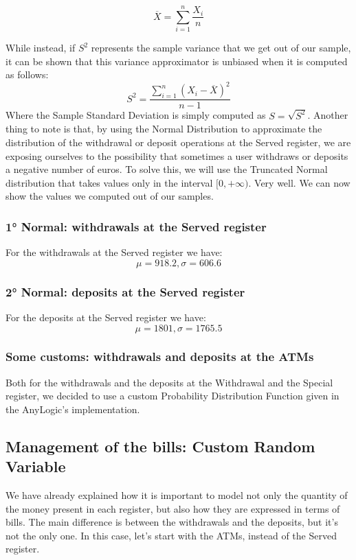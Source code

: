 \documentclass{article}
\begin{document}
  \[ \overline{X} = \sum_{i=1}^{n} \frac{X_i}{n}\]

While instead, if $S^{2}$ represents the sample variance that we get out of our sample, it can be shown that this variance approximator is unbiased when it is computed as follows:
    \[S^{2} = \frac{\sum_{i=1}^{n}(X_i - \overline{X})^{2}}{n-1}\]
Where the Sample Standard Deviation is simply computed as $S = \sqrt{S^{2}}$.
\newline Another thing to note is that, by using the Normal Distribution to approximate the distribution of the withdrawal or deposit operations at the Served register, we are exposing ourselves to the possibility that sometimes a user withdraws or deposits a negative number of euros. To solve this, we will use the Truncated Normal distribution that takes values only in the interval $[0, + \infty)$.
Very well. We can now show the values we computed out of our samples.

\subsubsection{1° Normal: withdrawals at the Served register}
For the withdrawals at the Served register we have:
\begin{equation*}
    \mu = 918.2, \sigma = 606.6
\end{equation*}
\subsubsection{2° Normal: deposits at the Served register}
For the deposits at the Served register we have:
\begin{equation*}
    \mu = 1801, \sigma = 1765.5
\end{equation*}
\subsubsection{Some customs: withdrawals and deposits at the ATMs}
Both for the withdrawals and the deposits at the Withdrawal and the Special register, we decided to use a custom Probability Distribution Function given in the AnyLogic's implementation.

\subsection{Management of the bills: Custom Random Variable}
We have already explained how it is important to model not only the quantity of the money present in each register, but also how they are expressed in terms of bills. The main difference is between the withdrawals and the deposits, but it's not the only one. In this case, let's start with the ATMs, instead of the Served register.
\end{document}
